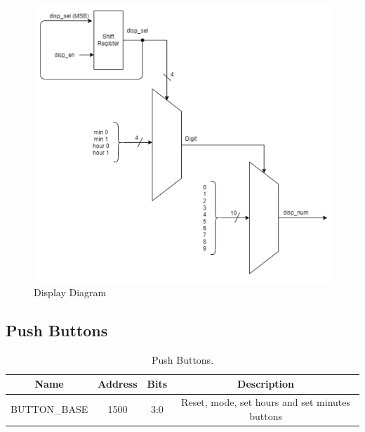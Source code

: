 \begin{figure}[!h]
    \centerline{\includegraphics[width=15cm]{figures/83245571_235640547450606_3622537552461824000_n.png}}
    \vspace{0cm}\caption{Display Diagram}
    \label{fig:DisplayD}
\end{figure}



\subsection{Push Buttons}

\begin{table}[h]
\centering
\caption{Push Buttons.}
\sffamily
    \begin{tabular}{|c|c|c|c|}
        \hline
        \textbf{Name} & \textbf{Address} & \textbf{Bits} & \textbf{Description} \\ [0.5ex]
        \hline
        \hline
        BUTTON\_BASE & 1500 & 3:0 & Reset, mode, set hours and set minutes buttons\\
        \hline
    \end{tabular}
\end{table}

